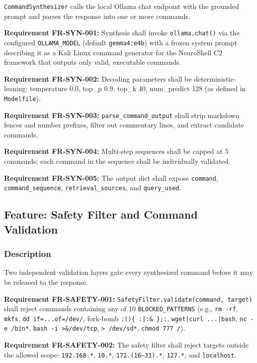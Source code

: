 \documentclass[10pt,journal,onecolumn]{IEEEtran}
\newcommand{\reqid}[1]{\textbf{#1}}
\begin{document}
\texttt{CommandSynthesizer} calls the local Ollama chat endpoint with the grounded prompt and parses the response into one or more commands.

\reqid{Requirement FR-SYN-001:} Synthesis shall invoke \texttt{ollama.chat()} via the configured \texttt{OLLAMA\_MODEL} (default \texttt{gemma4:e4b}) with a frozen system prompt describing it as a Kali Linux command generator for the NeuroShell C2 framework that outputs only valid, executable commands.

\reqid{Requirement FR-SYN-002:} Decoding parameters shall be deterministic-leaning: temperature 0.0, top\_p 0.9, top\_k 40, num\_predict 128 (as defined in \texttt{Modelfile}).

\reqid{Requirement FR-SYN-003:} \texttt{parse\_command\_output} shall strip markdown fences and number prefixes, filter out commentary lines, and extract candidate commands.

\reqid{Requirement FR-SYN-004:} Multi-step sequences shall be capped at 5 commands; each command in the sequence shall be individually validated.

\reqid{Requirement FR-SYN-005:} The output dict shall expose \texttt{command}, \texttt{command\_sequence}, \texttt{retrieval\_sources}, and \texttt{query\_used}.

\subsection{Feature: Safety Filter and Command Validation}

\subsubsection{Description}

Two independent validation layers gate every synthesized command before it may be released to the response.

\reqid{Requirement FR-SAFETY-001:} \texttt{SafetyFilter.\allowbreak validate(command, target)} shall reject commands containing any of 10 \texttt{BLOCKED\_PATTERNS} (e.g., \texttt{rm -rf}, \texttt{mkfs}, \texttt{dd if=...of=/dev/}, fork-bomb \texttt{:()\{ :|:\& \};:}, \texttt{wget|curl ...|bash}, \texttt{nc -e /bin*}, \texttt{bash -i >\&/dev/tcp}, \texttt{> /dev/sd*}, \texttt{chmod 777 /}).

\reqid{Requirement FR-SAFETY-002:} The safety filter shall reject targets outside the allowed scope: \texttt{192.168.*}, \texttt{10.*}, \texttt{172.(16--31).*}, \texttt{127.*}, and \texttt{localhost}.
\end{document}

